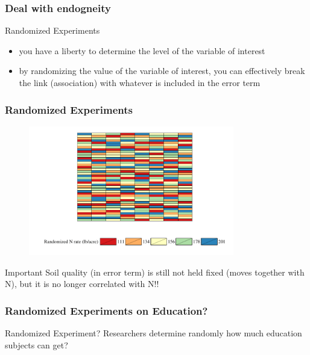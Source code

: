\documentclass[fleqn]{beamer}\usepackage[]{graphicx}\usepackage[]{color}
\begin{document}
\begin{frame}[c]
  \frametitle{Deal with endogneity}
  \begin{block}{Randomized Experiments}
    \begin{itemize}
      \item you have a liberty to determine the level of the variable of interest
      \item by randomizing the value of the variable of interest, you can effectively break the link (association) with whatever is included in the error term
    \end{itemize}
  \end{block}
\end{frame}

\begin{frame}[c]
  \frametitle{Randomized Experiments}
  \begin{figure}
  \centering
      \includegraphics[trim = 0mm 0mm 0mm 0mm, clip,width=0.8\textwidth]{field_map_N_IL.pdf}
  \end{figure}
  \begin{block}{Important}
    Soil quality (in error term) is still not held fixed (moves together with N), but it is no longer correlated with N!!
  \end{block}
\end{frame}

\begin{frame}[c]
  \frametitle{Randomized Experiments on Education?}
  \begin{block}{Randomized Experiment?}
    Researchers determine randomly how much education subjects can get?
  \end{block}

\end{frame}
\end{document}
